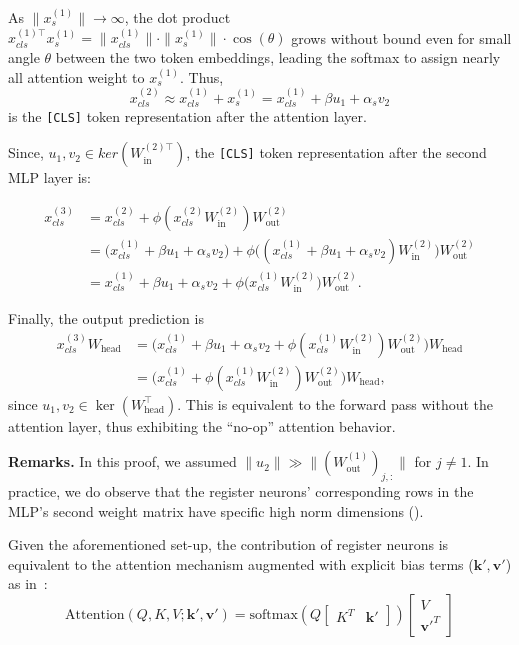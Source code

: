 \documentclass{article}
\begin{document}
As \( \|x^{(1)}_{s}\| \to \infty \), the dot product $x^{(1)\top}_{cls} x^{(1)}_{s} = \|x^{(1)}_{cls}\| \cdot \|x^{(1)}_{s}\| \cdot \cos(\theta)$
grows without bound even for small angle \( \theta \) between the two token embeddings, leading the softmax to assign nearly all attention weight to \( x^{(1)}_{s} \). Thus, 
\begin{equation}
    x^{(2)}_{cls} \approx x^{(1)}_{cls} + x^{(1)}_{s} = x^{(1)}_{cls} + \beta u_1+\alpha_sv_2
    \label{attention_eq}
\end{equation} is the \texttt{[CLS]} token representation after the attention layer. 


Since, $u_1, v_2 \in ker(W_{\text{in}}^{(2)\top})$, the \texttt{[CLS]} token representation after the second MLP layer is:

\begin{align}
    x^{(3)}_{cls} 
    &= x^{(2)}_{cls}+\phi\!\left(x^{(2)}_{cls}W_{\text{in}}^{(2)}\right)W_{\text{out}}^{(2)} \\
    &= \big(x^{(1)}_{cls} + \beta u_1+\alpha_sv_2\big) 
       + \phi \big((x^{(1)}_{cls} + \beta u_1+\alpha_sv_2)W_{\text{in}}^{(2)}\big)W_{\text{out}}^{(2)} \\
    &= x^{(1)}_{cls} + \beta u_1+\alpha_sv_2 
       + \phi \big(x^{(1)}_{cls}W_{\text{in}}^{(2)}\big)W_{\text{out}}^{(2)}.
\end{align}

Finally, the output prediction is
\begin{align}
    x^{(3)}_{cls}W_{\text{head}} 
    &= \big(x^{(1)}_{cls} + \beta u_1 + \alpha_s v_2 
       + \phi (x^{(1)}_{cls}W_{\text{in}}^{(2)})W_{\text{out}}^{(2)}\big) W_{\text{head}} \\
    &= \big(x^{(1)}_{cls} 
       + \phi (x^{(1)}_{cls}W_{\text{in}}^{(2)})W_{\text{out}}^{(2)}\big) W_{\text{head}},
\end{align}
since $u_1, v_2 \in \ker(W^\top_{\text{head}})$. 
This is equivalent to the forward pass without the attention layer, 
thus exhibiting the ``no-op'' attention behavior.

\textbf{Remarks.} In this proof, we assumed $\|u_2\|
 \gg\|(W_{\text{out}}^{(1)})_{j,:}\|$ for $j \neq 1$. In practice, we do observe that the register neurons' corresponding rows in the MLP's second weight matrix have specific high norm dimensions ().


\renewcommand\thecorollary{1} \begin{corollary}
\label{corollary:register_bias}
Given the aforementioned set-up, the contribution of register neurons is equivalent to the attention mechanism augmented with explicit bias terms  ($\mathbf{k}', \mathbf{v}'$) as in~\cite{sunmassive}: $$\text{Attention}(Q, K, V; \mathbf{k}', \mathbf{v}') = \text{softmax}\left( Q \begin{bmatrix} K^T & \mathbf{k}' \end{bmatrix} \right) \begin{bmatrix} V \\ \mathbf{v}'^T \end{bmatrix}$$ 
\end{corollary}
\end{document}
